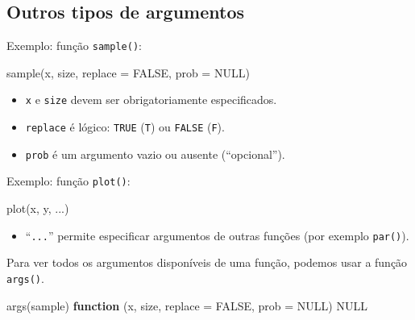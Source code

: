 \documentclass[
  10pt,
  a4paper]{book}
\newenvironment{Shaded}{\begin{snugshade}}{\end{snugshade}}
\newcommand{\AttributeTok}[1]{\textcolor[rgb]{0.77,0.63,0.00}{#1}}
\newcommand{\ConstantTok}[1]{\textcolor[rgb]{0.00,0.00,0.00}{#1}}
\newcommand{\ControlFlowTok}[1]{\textcolor[rgb]{0.13,0.29,0.53}{\textbf{#1}}}
\newcommand{\FunctionTok}[1]{\textcolor[rgb]{0.00,0.00,0.00}{#1}}
\newcommand{\NormalTok}[1]{#1}
\providecommand{\tightlist}{%
  \setlength{\itemsep}{0pt}\setlength{\parskip}{0pt}}
\begin{document}
\hypertarget{outros-tipos-de-argumentos}{%
\subsection{Outros tipos de argumentos}\label{outros-tipos-de-argumentos}}

Exemplo: função \texttt{sample()}:

\begin{Shaded}
\begin{Highlighting}[]
\FunctionTok{sample}\NormalTok{(x, size, }\AttributeTok{replace =} \ConstantTok{FALSE}\NormalTok{, }\AttributeTok{prob =} \ConstantTok{NULL}\NormalTok{)}
\end{Highlighting}
\end{Shaded}

\begin{itemize}
\tightlist
\item
  \texttt{x} e \texttt{size} devem ser obrigatoriamente especificados.
\item
  \texttt{replace} é lógico: \texttt{TRUE} (\texttt{T}) ou \texttt{FALSE} (\texttt{F}).
\item
  \texttt{prob} é um argumento vazio ou ausente (``opcional'').
\end{itemize}

Exemplo: função \texttt{plot()}:

\begin{Shaded}
\begin{Highlighting}[]
\FunctionTok{plot}\NormalTok{(x, y, ...)}
\end{Highlighting}
\end{Shaded}

\begin{itemize}
\tightlist
\item
  ``\texttt{...}'' permite especificar argumentos de outras funções (por exemplo
  \texttt{par()}).
\end{itemize}

Para ver todos os argumentos disponíveis de uma função, podemos usar a
função \texttt{args()}.

\begin{Shaded}
\begin{Highlighting}[]
\FunctionTok{args}\NormalTok{(sample)}
\ControlFlowTok{function}\NormalTok{ (x, size, }\AttributeTok{replace =} \ConstantTok{FALSE}\NormalTok{, }\AttributeTok{prob =} \ConstantTok{NULL}\NormalTok{) }
\ConstantTok{NULL}
\end{Highlighting}
\end{Shaded}
\end{document}
